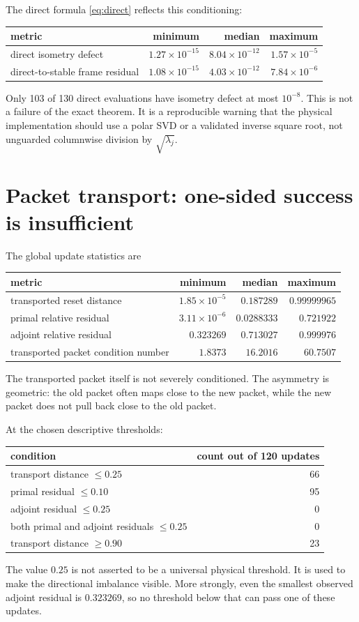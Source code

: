 \documentclass[12pt]{article}
\theoremstyle{remark}
\begin{document}
The direct formula \eqref{eq:direct} reflects this conditioning:
\begin{center}
\begin{tabular}{lrrr}
\toprule
metric & minimum & median & maximum\\
\midrule
direct isometry defect
& $1.27\times10^{-15}$ & $8.04\times10^{-12}$ & $1.57\times10^{-5}$\\
direct-to-stable frame residual
& $1.08\times10^{-15}$ & $4.03\times10^{-12}$ & $7.84\times10^{-6}$\\
\bottomrule
\end{tabular}
\end{center}
Only 103 of 130 direct evaluations have isometry defect at most $10^{-8}$.
This is not a failure of the exact theorem.  It is a reproducible warning that
the physical implementation should use a polar SVD or a validated inverse
square root, not unguarded columnwise division by $\sqrt{\lambda_j}$.

\section{Packet transport: one-sided success is insufficient}

The global update statistics are
\begin{center}
\begin{tabular}{lrrr}
\toprule
metric & minimum & median & maximum\\
\midrule
transported reset distance
& $1.85\times10^{-5}$ & $0.187289$ & $0.99999965$\\
primal relative residual
& $3.11\times10^{-6}$ & $0.0288333$ & $0.721922$\\
adjoint relative residual
& $0.323269$ & $0.713027$ & $0.999976$\\
transported packet condition number
& $1.8373$ & $16.2016$ & $60.7507$\\
\bottomrule
\end{tabular}
\end{center}
The transported packet itself is not severely conditioned.  The asymmetry is
geometric: the old packet often maps close to the new packet, while the new
packet does not pull back close to the old packet.

At the chosen descriptive thresholds:
\begin{center}
\begin{tabular}{lr}
\toprule
condition & count out of 120 updates\\
\midrule
transport distance $\le0.25$ & 66\\
primal residual $\le0.10$ & 95\\
adjoint residual $\le0.25$ & 0\\
both primal and adjoint residuals $\le0.25$ & 0\\
transport distance $\ge0.90$ & 23\\
\bottomrule
\end{tabular}
\end{center}
The value $0.25$ is not asserted to be a universal physical threshold.  It is
used to make the directional imbalance visible.  More strongly, even the
smallest observed adjoint residual is $0.323269$, so no threshold below that
can pass one of these updates.
\end{document}
